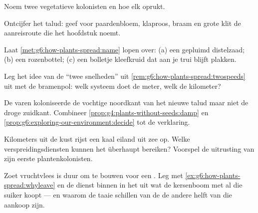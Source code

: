 \begin{exercise}[$\star$]\label{exo:g6:how-plants-spread:6}
Noem twee vegetatieve kolonisten en hoe elk oprukt.
\end{exercise}

\begin{exercise}[$\star\star$]\label{exo:g6:how-plants-spread:7}
Ontcijfer het talud: geef voor paardenbloem, klaproos, braam en grote
klit de aanreisroute die het hoofdstuk noemt.
\end{exercise}

\begin{exercise}[$\star\star$]\label{exo:g6:how-plants-spread:8}
Laat \cref{met:g6:how-plants-spread:name} lopen over: (a) een gepluimd
distelzaad; (b) een rozenbottel; (c) een bolletje kleefkruid dat aan je
trui blijft plakken.
\end{exercise}

\begin{exercise}[$\star\star$]\label{exo:g6:how-plants-spread:9}
Leg het idee van de ``twee snelheden'' uit
\cref{rem:g6:how-plants-spread:twospeeds} uit met de bramenpol: welk
systeem doet de meter, welk de kilometer?
\end{exercise}

\begin{exercise}[$\star\star$]\label{exo:g6:how-plants-spread:10}
De varen koloniseerde de vochtige noordkant van het nieuwe talud maar
niet de droge zuidkant. Combineer
\cref{prop:g4:plants-without-seeds:damp} en
\cref{prop:g6:exploring-our-environment:decide} tot de verklaring.
\end{exercise}

\begin{exercise}[$\star\star$]\label{exo:g6:how-plants-spread:11}
Kilometers uit de kust rijst een kaal eiland uit zee op. Welke
verspreidingsdiensten kunnen het überhaupt bereiken? Voorspel de
uitrusting van zijn eerste plantenkolonisten.
\end{exercise}

\begin{exercise}[$\star\star\star$]\label{exo:g6:how-plants-spread:12}
Zoet vruchtvlees is duur om te bouwen voor een . Leg met
\cref{ex:g6:how-plants-spread:whyleave} en de dienst binnen in het 
uit wat de kersenboom met al die suiker koopt --- en waarom de taaie
schillen van de  de andere helft van die aankoop zijn.
\end{exercise}

